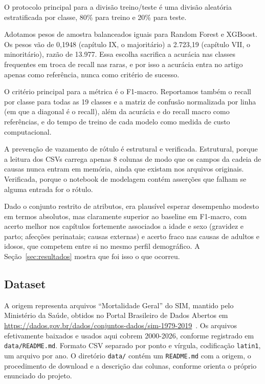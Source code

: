 \documentclass[12pt]{article}
\begin{document}
O protocolo principal para a divisão treino/teste é uma divisão aleatória estratificada por classe, 80\% para treino e 20\% para teste. 

Adotamos pesos de amostra balanceados iguais para Random Forest e XGBoost. Os pesos vão de 0,1948 (capítulo IX, o majoritário) a 2.723,19 (capítulo VII, o minoritário), razão de 13.977. Essa escolha sacrifica a acurácia nas classes frequentes em troca de recall nas raras, e por isso a acurácia entra no artigo apenas como referência, nunca como critério de
sucesso.

O critério principal para a métrica é o F1-macro. Reportamos também o recall por classe para todas as 19 classes e a matriz de confusão normalizada por linha (em que a diagonal é o recall), além da acurácia e do recall macro como referências, e do tempo de treino de cada modelo como medida de custo computacional.

A prevenção  de vazamento de rótulo é estrutural e verificada. Estrutural, porque a leitura dos CSVs carrega apenas 8 colunas de modo que os campos da cadeia de causas nunca entram em memória, ainda que existam nos arquivos originais. Verificada, porque o notebook de modelagem contém asserções que falham se alguma entrada for o rótulo.


Dado o conjunto restrito de atributos, era plausível esperar desempenho modesto em termos absolutos, mas claramente superior ao baseline em F1-macro, com acerto melhor nos capítulos fortemente associados a idade e sexo (gravidez e parto; afecções perinatais; causas externas) e acerto fraco nas causas de adultos e idosos, que competem entre si no mesmo perfil demográfico. A Seção~\ref{sec:resultados} mostra que foi isso
o que ocorreu.

\subsection{Dataset}
\label{sec:dataset}

A origem representa arquivos ``Mortalidade Geral'' do SIM, mantido
pelo Ministério da Saúde, obtidos no Portal Brasileiro de Dados Abertos em \url{https://dados.gov.br/dados/conjuntos-dados/sim-1979-2019}~\cite{sim_dadosgov}. Os arquivos efetivamente baixados e usados aqui cobrem 2000-2026, conforme registrado em \texttt{data/README.md}. Formato CSV separado por ponto e vírgula, codificação \texttt{latin1}, um arquivo por ano. O diretório \texttt{data/} contém um \texttt{README.md} com a origem, o procedimento de download e a descrição das colunas, conforme orienta o próprio enunciado do
projeto.
\end{document}
